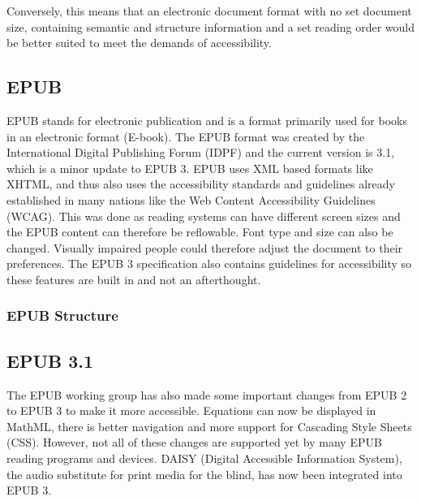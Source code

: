 Conversely, this means that an electronic document format with no set document size, containing semantic and structure information and a set reading order would be better suited to meet the demands of accessibility. 

\subsection{EPUB}
EPUB stands for electronic publication and is a format primarily used for books in an electronic format (E-book). The EPUB format was created by the International Digital Publishing Forum (IDPF) and the current version is 3.1, which is a minor update to EPUB 3.\cite{EPUBspecs} EPUB uses XML based formats  like XHTML, and thus also uses the accessibility standards and guidelines already established in many nations like the Web Content Accessibility Guidelines (WCAG). \cite{WCAG} This was done as reading systems can have different screen sizes and the EPUB content can therefore be reflowable. Font type and size can also be changed. Visually impaired people could therefore adjust the document to their preferences. The EPUB 3 specification also contains guidelines for accessibility so these features are built in and not an afterthought.\cite{EPUB3bp}

\subsubsection{EPUB Structure}


\subsection{EPUB 3.1}
The EPUB working group has also made some important changes from EPUB 2 to EPUB 3  to make it more accessible. Equations can now be displayed in MathML, there is better navigation and more support for Cascading Style Sheets (CSS). However, not all of these changes are supported yet by many EPUB reading programs and devices.\cite{EPUB30changes} DAISY (Digital Accessible Information System), the audio substitute for print media for the blind, has now been integrated into EPUB 3.\cite{daisyAccessibility}
